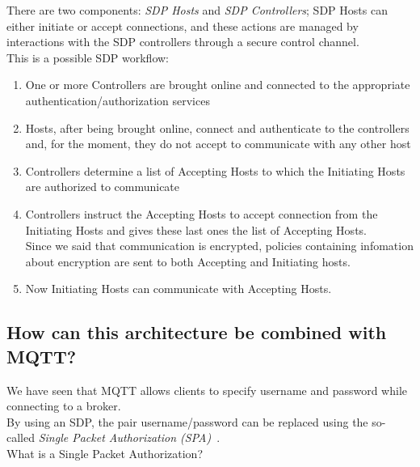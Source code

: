 \documentclass[12pt]{report}
\begin{document}
{{There are two components: \emph{SDP Hosts} and \emph{SDP Controllers}; SDP Hosts can either initiate or accept connections, and these actions are managed by interactions with the SDP controllers through a secure control channel.\\
This is a possible SDP workflow:

\begin{enumerate}
\item One or more Controllers are brought online and connected to the appropriate authentication/authorization services
\item Hosts, after being brought online, connect and authenticate to the controllers and, for the moment, they do not accept to communicate with any other host
\item Controllers determine a list of Accepting Hosts to which the Initiating Hosts are authorized to communicate
\item Controllers instruct the Accepting Hosts to accept connection from the Initiating Hosts and gives these last ones the list of Accepting Hosts.\\
Since we said that communication is encrypted, policies containing infomation about encryption are sent to both Accepting and Initiating hosts.
\item Now Initiating Hosts can communicate with Accepting Hosts.\\
\end{enumerate}

\subsection{How can this architecture be combined with MQTT?}
\bigskip

We have seen that MQTT allows clients to specify username and password while connecting to a broker.\\By using an SDP, the pair username/password can be replaced using the so-called \emph{Single Packet Authorization (SPA)}~\cite{mqttonlywithsdp}.\\

What is a Single Packet Authorization?~\cite{portknockandspaanalysis}\\

}}
\end{document}
